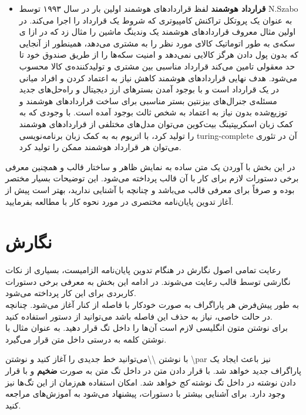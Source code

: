 \begin{itemize}
	\item
	\textbf{قرارداد هوشمند}
	لفظ قرارداد‌های هوشمند اولین بار در سال ۱۹۹۳ توسط N.Szabo به عنوان یک پروتکل تراکنش کامپیوتری که شروط یک قرارداد را اجرا می‌کند. در اولین مثال معروف قرارداد‌های هوشمند یک وندینگ‌ ماشین را مثال زد که در ازا ی سکه‌ی به طور اتوماتیک کالای مورد نظر را به مشتری می‌دهد، همینطور از آنجایی که بدون پول دادن هرگز کالایی نمی‌دهد و امنیت سکه‌ها را از طریق صندوق خود تا حد معقولی تامین می‌کند قرارداد مناسبی بین مشتری و تولیدکننده‌ی کالا محسوب می‌شود.
	هدف نهایی قراردادهای هوشمند کاهش نیاز به اعتماد کردن و افراد میانی در یک قرارداد است و با بوجود آمدن بسترهای ارز دیجیتال و راه‌حل‌های جدید مسئله‌ی جنرال‌های بیزنتین بستر مناسبی برای ساخت قراردادهای هوشمند و توزیع‌شده بدون نیاز به اعتماد به شخص ثالث بوجود آمده است. 
	با وجودی که به کمک زبان اسکریپتینگ بیت‌کوین می‌توان مدل‌های مختلفی از قرارداد‌های هوشمند را تولید کرد، با اتریوم به به کمک زبان برنامه‌نویسی turing-complete آن در تئوری می‌توان هر قرارداد هوشمند ممکن را تولید کرد. 
	
	
\end{itemize}

در این بخش با آوردن یک متن ساده به نمایش ظاهر و ساختار قالب و همچنین معرفی برخی دستورات لازم برای کار با آن قالب پرداخته می‌شود. این توضیحات بسیار مختصر بوده و صرفاً برای معرفی قالب می‌باشد و چنانچه با  آشنایی ندارید، بهتر است پیش از آغاز تدوین پایان‌نامه مختصری در مورد نحوه کار با  مطالعه بفرمایید.
\section{نگارش}
رعایت تمامی اصول نگارش در هنگام تدوین پایان‌نامه الزامیست، بسیاری از نکات نگارشی توسط قالب رعایت می‌شوند. در ادامه این بخش به معرفی برخی دستورات کاربردی برای این کار پرداخته می‌شود.
\\
به طور پیش‌‌فرض هر پاراگراف به صورت خودکار با فاصله  از کنار آغاز می‌شود.  چنانچه در حالت خاصی، نیاز به حذف این فاصله باشد می‌توانید از دستور 
 \RTL{}\noindent
استفاده کنید.\\
برای نوشتن متون انگلیسی لازم است آن‌ها را داخل تگ
 قرار دهید. به عنوان مثال با نوشتن 
 کلمه  به درستی داخل متن قرار می‌گیرد.
 \par
 با نوشتن \textbackslash\textbackslash می‌توانید خط جدیدی را آغاز کنید و نوشتن \textbackslash par نیز باعث ایجاد یک پاراگراف جدید خواهد شد. با قرار دادن متن در داخل تگ  متن به صورت \textbf{ضخیم} و با قرار دادن نوشته در داخل تگ  نوشته \textit{کج} خواهد شد. امکان استفاده هم‌زمان از این تگ‌ها نیز وجود دارد. برای آشنایی بیشتر با دستورات، پیشنهاد می‌شود به آموزش‌های  مراجعه کنید.
 \par

